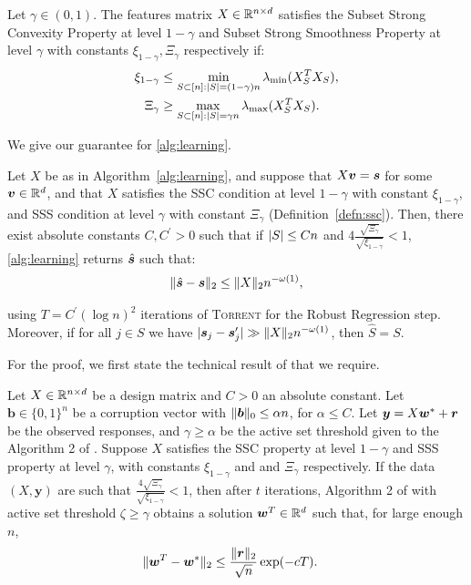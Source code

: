 \begin{definition}
Let $\gamma \in (0,1)$. The features matrix $X \in \mathbb{R}^{n \times d}$ satisfies the Subset Strong Convexity Property at level $1 - \gamma$ and Subset Strong Smoothness Property at level $\gamma$ with constants $\xi_{1-\gamma}, \Xi_\gamma$ respectively if: 
\begin{align*}
\xi_{1-\gamma} &\leq 
\min\limits_{S \subset [n]: \lvert S\rvert = (1-\gamma) n} \lambda_{\min}(X_S^T X_S), \\
\Xi_{\gamma} &\geq \max\limits_{S \subset [n]: \lvert S\rvert = \gamma n} \lambda_{\max}(X_S^T X_S).
\end{align*}
\label{defn:ssc}
\end{definition}

\noindent We give our guarantee for \cref{alg:learning}.

\begin{proposition}
Let $X$ be as in Algorithm~\ref{alg:learning}, and suppose that $X \bm{v} = \bm{s}$ for some $\bm{v} \in \mathbb{R}^d$, and that $X$ satisfies the SSC condition at level $1 - \gamma$ with constant $\xi_{1-\gamma}$, and SSS condition at level $\gamma$ with constant $\Xi_\gamma$ (Definition~\ref{defn:ssc}). Then, there exist absolute constants $C, C^\prime > 0$ such that if $\lvert S\rvert \leq Cn$ and $4\frac{\sqrt{\Xi_{\gamma}}}{\sqrt{\xi_{1-\gamma}}} < 1$, \cref{alg:learning} returns $\hat {\bm{s}}$ such that: 
\begin{align*}
\| \hat {\bm{s}} - \bm{s} \|_2 \leq \| X \|_2 n^{-\omega(1)},
\end{align*}

using $T = C^\prime (\log n)^{2}$ iterations of \textsc{Torrent} for the Robust Regression step. Moreover, if for all $j \in S$ we have $\lvert\bm{s}_j - \bm{s}_j^\prime\rvert \gg \| X \|_2 n^{-\omega(1)}$, then $\hat S = S$. 
\label{prop:b-recovery}
\end{proposition}
 
\noindent For the proof, we first state the technical result of \citet{torrent-2015} that we require. 

\begin{thrm}
Let $X \in \mathbb{R}^{n \times d}$ be a 
design matrix and $C > 0$ an absolute constant. Let $\bm b \in \{ 0, 1 \}^n$ be a corruption vector with $\| \bm b \|_0 \leq \alpha n$, for $\alpha \leq C$. Let $\bm{y} = X\bm{w}^* + \bm{r}$ be the observed responses, and $\gamma \ge \alpha$ be the active set threshold given to the Algorithm 2 of \citet{torrent-2015}. Suppose $X$ satisfies the SSC property at level $1 - \gamma$ and SSS property at level $\gamma$, with constants $\xi_{1-\gamma}$ and and $\Xi_\gamma$ respectively. If the data $(X, \bm{y})$ are such that $\frac{4\sqrt{\Xi_\gamma}}{\sqrt{\xi_{1 - \gamma}}} < 1$, 
then after $t$ iterations, Algorithm 2 of \citet{torrent-2015} with active set threshold $\zeta \ge \gamma$ obtains a solution $\bm{w}^T \in \mathbb{R}^d$ such that, for large enough $n$, 
\begin{align*}
\| \bm{w}^T - \bm{w}^* \|_2 &\leq \frac{\| \bm{r} \|_2}{\sqrt{n}} \exp(-cT).
\end{align*}
\label{thrm:torrent}
\end{thrm}

